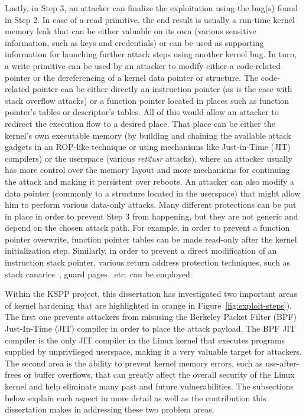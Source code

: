 Lastly, in Step 3, an attacker can finalize the exploitation using the bug(s) found in Step 2. In case of a read primitive, the end result is usually a run-time kernel memory leak that can be either valuable on its own (various sensitive information, such as keys and credentials) or can be used as supporting information for launching further attack steps using another kernel bug. In turn, a write primitive can be used by an attacker to modify either a code-related pointer or the dereferencing of a kernel data pointer or structure. The code-related pointer can be either directly an instruction pointer (as is the case with stack overflow attacks) or a function pointer located in places such as function pointer's tables or descriptor's tables. All of this would allow an attacker to redirect the execution flow to a desired place. That place can be either the kernel's own executable memory (by building and chaining the available attack gadgets in an ROP-like technique or using mechanisms like Just-in-Time (JIT) compilers) or the userspace (various \textit{ret2usr} attacks), where an attacker usually has more control over the memory layout and more mechanisms for continuing the attack and making it persistent over reboots. An attacker can also modify a data pointer (commonly to a structure located in the userspace) that might allow him to perform various data-only attacks. Many different protections can be put in place in order to prevent Step 3 from happening, but they are not generic and depend on the chosen attack path. For example, in order to prevent a function pointer overwrite, function pointer tables can be made read-only after the kernel initialization step. Similarly, in order to prevent a direct modification of an instruction stack pointer, various return address protection techniques, such as stack canaries~\cite{edge2014}, guard pages~\cite{kstackoverflow2017} etc. can be employed.    

Within the KSPP project, this dissertation has investigated two important areas of kernel hardening that are highlighted in orange in Figure~\ref{fig:exploit-steps}). The first one prevents attackers from misusing the Berkeley Packet Filter (BPF) Just-In-Time (JIT) compiler in order to place the attack payload. The BPF JIT compiler is the only JIT compiler in the Linux kernel that executes programs supplied by unprivileged userspace, making it a very valuable target for attackers.  The second area is the ability to prevent kernel memory errors, such as use-after-frees or buffer overflows, that can greatly affect the overall security of the Linux kernel and help eliminate many past and future vulnerabilities. The subsections below explain each aspect in more detail as well as the contribution this dissertation makes in addressing these two problem areas.  

